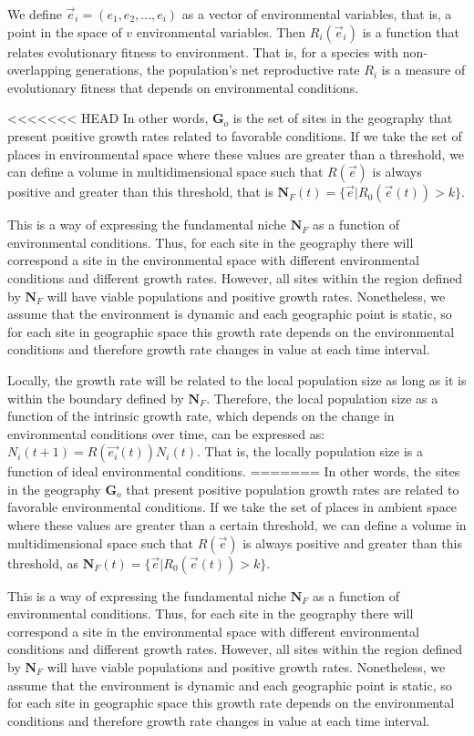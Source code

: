 \documentclass[
]{article}
\begin{document}
We define \(\vec{e}_i =(e_1, e_2, ..., e_i )\) as a vector of
environmental variables, that is, a point in the space of \(v\)
environmental variables. Then \(R_i(\vec{e}_i)\) is a function that
relates evolutionary fitness to environment. That is, for a species with
non-overlapping generations, the population's net reproductive rate
\(R_i\) is a measure of evolutionary fitness that depends on
environmental conditions.

<<<<<<< HEAD
In other words, \(\mathbf{G}_o\) is the set of sites in the geography
that present positive growth rates related to favorable conditions. If
we take the set of places in environmental space where these values are
greater than a threshold, we can define a volume in multidimensional
space such that \(R(\vec{e})\) is always positive and greater than this
threshold, that is
\(\mathbf{N}_F(t) = \{\vec{e} | R_0(\vec{e}(t)) > k \}\).

This is a way of expressing the fundamental niche \(\mathbf{N}_F\) as a
function of environmental conditions. Thus, for each site in the
geography there will correspond a site in the environmental space with
different environmental conditions and different growth rates. However,
all sites within the region defined by \(\mathbf{N}_F\) will have viable
populations and positive growth rates. Nonetheless, we assume that the
environment is dynamic and each geographic point is static, so for each
site in geographic space this growth rate depends on the environmental
conditions and therefore growth rate changes in value at each time
interval.

Locally, the growth rate will be related to the local population size as
long as it is within the boundary defined by \(\mathbf{N}_F\).
Therefore, the local population size as a function of the intrinsic
growth rate, which depends on the change in environmental conditions
over time, can be expressed as: \(N_i(t+1) = R(\vec{e_i}(t) ) N_i(t)\).
That is, the locally population size is a function of ideal
environmental conditions.
=======
In other words, the sites in the geography \(\mathbf{G}_o\) that present
positive population growth rates are related to favorable environmental conditions. If we take
the set of places in ambient space where these values are greater than a
certain threshold, we can define a volume in multidimensional space such that
\(R(\vec{e})\) is always positive and greater than this threshold, as \(\mathbf{N}_F(t) = \{\vec{e} | R_0(\vec{e}(t)) > k \}\).

This is a way of expressing the fundamental niche \(\mathbf{N}_F\) as a function of
environmental conditions. Thus, for each site in the geography there will
correspond a site in the environmental space with different
environmental conditions and different growth rates. However, all sites
within the region defined by \(\mathbf{N}_F\) will have viable
populations and positive growth rates. Nonetheless, we assume that the environment
is dynamic and each geographic point is static, so for each site in
geographic space this growth rate depends on the environmental conditions and
therefore growth rate changes in value at each time interval.
\end{document}
